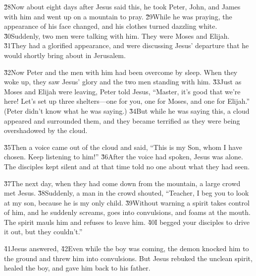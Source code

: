 \v{28}Now about eight days after Jesus said this, he took Peter, John, and James with him and went up on a mountain to pray. \v{29}While he was praying, the appearance of his face changed, and his clothes turned dazzling white. \v{30}Suddenly, two men were talking with him. They were Moses and Elijah. \v{31}They had a glorified appearance, and were discussing Jesus' departure that he would shortly bring about in Jerusalem.

\v{32}Now Peter and the men with him had been overcome by sleep. When they woke up, they saw Jesus' glory and the two men standing with him. \v{33}Just as Moses and Elijah were leaving, Peter told Jesus, ``Master, it's good that we're here! Let's set up three shelters---one for you, one for Moses, and one for Elijah.'' (Peter didn't know what he was saying.) \v{34}But while he was saying this, a cloud appeared and surrounded them, and they became terrified as they were being overshadowed by the cloud.

\v{35}Then a voice came out of the cloud and said, ``This is my Son, whom I have chosen. Keep listening to him!'' \v{36}After the voice had spoken, Jesus was alone. The disciples kept silent and at that time told no one about what they had seen.

\v{37}The next day, when they had come down from the mountain, a large crowd met Jesus. \v{38}Suddenly, a man in the crowd shouted, ``Teacher, I beg you to look at my son, because he is my only child. \v{39}Without warning a spirit takes control of him, and he suddenly screams, goes into convulsions, and foams at the mouth. The spirit mauls him and refuses to leave him. \v{40}I begged your disciples to drive it out, but they couldn't.''

\v{41}Jesus answered,  \v{42}Even while the boy was coming, the demon knocked him to the ground and threw him into convulsions. But Jesus rebuked the unclean spirit, healed the boy, and gave him back to his father.

